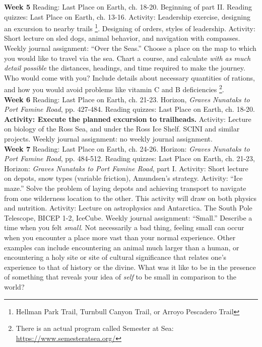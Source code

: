 \documentclass[10pt]{article}
\begin{document}
\begin{outline}[enumerate]
\1 \textbf{Week 5}
\2 Reading: Last Place on Earth, ch. 18-20. Beginning of part II.
\2 Reading quizzes: Last Place on Earth, ch. 13-16.
\2 Activity: Leadership exercise, designing an excursion to nearby trails \footnote{Hellman Park Trail, Turnbull Canyon Trail, or Arroyo Pescadero Trail}. Designing of orders, styles of leadership.
\2 Activity: Short lecture on sled dogs, animal behavior, and navigation with compasses.
\2 Weekly journal assignment: ``Over the Seas.''  Choose a place on the map to which you would like to travel via the sea.  Chart a course, and calculate \textit{with as much detail possible} the distances, headings, and time required to make the journey.  Who would come with you?  Include details about necessary quantities of rations, and how you would avoid problems like vitamin C and B deficiencies \footnote{There is an actual program called Semester at Sea: \url{https://www.semesteratsea.org/}}. \\
\1 \textbf{Week 6}
\2 Reading: Last Place on Earth, ch. 21-23. Horizon, \textit{Graves Nunataks to Port Famine Road}, pp. 427-484.
\2 Reading quizzes: Last Place on Earth, ch. 18-20.
\2 \textbf{Activity: Execute the planned excursion to trailheads.}
\2 Activity: Lecture on biology of the Ross Sea, and under the Ross Ice Shelf. SCINI and similar projects.
\2 Weekly journal assignment: no weekly journal assignment. \\
\1 \textbf{Week 7}
\2 Reading: Last Place on Earth, ch. 24-26. Horizon: \textit{Graves Nunataks to Port Famine Road}, pp. 484-512.
\2 Reading quizzes: Last Place on Earth, ch. 21-23, Horizon: \textit{Graves Nunataks to Port Famine Road}, part I.
\2 Activity: Short lecture on depots, snow types (variable friction), Amundsen's strategy.
\2 Activity: ``Ice maze.''  Solve the problem of laying depots and achieving transport to navigate from one wilderness location to the other.  This activity will draw on both physics and nutrition.
\2 Activity: Lecture on astrophysics and Antarctica.  The South Pole Telescope, BICEP 1-2, IceCube.
\2 Weekly journal assignment: ``Small.'' Describe a time when you felt \textit{small}.  Not necessarily a bad thing, feeling small can occur when you encounter a place more vast than your normal experience.  Other examples can include encountering an animal much larger than a human, or encountering a holy site or site of cultural significance that relates one's experience to that of history or the divine.  What was it like to be in the presence of something that reveals your idea of \textit{self} to be small in comparison to the world? \\

\end{outline}
\end{document}

